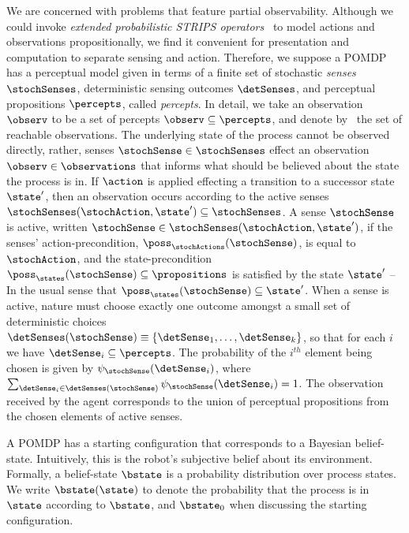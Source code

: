 \documentclass{article}
\begin{document}

We are concerned with problems that feature partial
observability. Although we could invoke {\em extended probabilistic
STRIPS operators}~\cite{rintanen:01} to model actions and observations
propositionally, we find it convenient for presentation and computation to
separate sensing and action. Therefore, we suppose a POMDP has a
perceptual model given in terms of a finite set of stochastic {\em
senses} $\stochSenses$, deterministic sensing outcomes $\detSenses$,
and perceptual propositions $\percepts$, called {\em percepts}. In
detail, we take an observation $\observ$ to be a set of percepts
$\observ \subseteq \percepts$, and denote by \observations\ the set of
reachable observations. The underlying state of the process cannot be
observed directly, rather, senses $\stochSense \in \stochSenses$
effect an observation $\observ \in
\observations$ that informs what should be believed about the state the
process is in. If $\action$ is applied effecting a
transition to a successor state $\state'$, then an observation occurs
according to the active senses $\stochSenses(\stochAction, \state')
\subseteq \stochSenses$. A sense $\stochSense$ is active, written
$\stochSense \in \stochSenses(\stochAction, \state')$, if the senses'
action-precondition, $\poss_\stochActions(\stochSense)$, is equal to
$\stochAction$, and the state-precondition $\poss_\states(\stochSense)
\subseteq \propositions$ is satisfied by the state $\state'$ -- In the
usual sense that \mbox{$\poss_\states(\stochSense)\subseteq\state'$}.
When a sense is active, nature must choose exactly one outcome amongst
a small set of deterministic choices $\detSenses(\stochSense)
\equiv \{\detSense_1, \ldots, \detSense_k \}$, so that for each
$i$ we have $\detSense_i \subseteq \percepts$. The probability of
the $i^{th}$ element being chosen is given by
$\psi_{\stochSense}(\detSense_i)$, where $\sum_{\detSense_i \in
\detSenses(\stochSense)} \psi_{\stochSense}(\detSense_i) =
1$. The observation received by the agent corresponds to the union of
perceptual propositions from the chosen elements of active
senses.

A POMDP has a starting configuration that corresponds to a Bayesian
belief-state. Intuitively, this is the robot's subjective belief about
its environment. Formally, a belief-state $\bstate$ is a probability
distribution over process states. We write $\bstate(\state)$ to denote
the probability that the process is in $\state$ according to
$\bstate$, and $\bstate_0$ when discussing the starting
configuration. 
\end{document}
